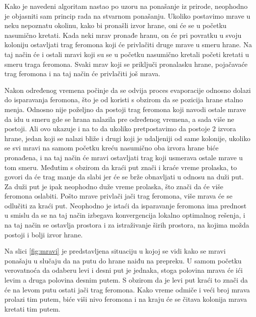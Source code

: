 \documentclass[a4paper]{article}
\begin{document}
{Kako je navedeni algoritam nastao po uzoru na ponašanje iz prirode, neophodno je objasniti sam princip rada na stvarnom ponašanju. Ukoliko postavimo mrave u neku nepoznatu okolinu, kako bi pronašli izvor hrane, oni će se u početku nasumično kretati. Kada neki mrav pronađe hranu, on će pri povratku u svoju koloniju ostavljati trag feromona koji će privlačiti druge mrave u smeru hrane. Na taj način će i ostali mravi koji su se u početku nasumično kretali početi kretati u smeru traga feromona. Svaki mrav koji se priključi pronalasku hrane, pojačavaće trag feromona i na taj način će privlačiti još mrava. 

\vspace{3mm}

Nakon određenog vremena počinje da se odvija proces evaporacije odnosno dolazi do isparavanja feromona, što je od koristi s obzirom da se pozicija hrane stalno menja. Odnosno nije poželjno da postoji trag feromona koji navodi ostale mrave da idu u smeru gde se hrana nalazila pre određenog vremena, a sada više ne postoji. Ali ovo ukazuje i na to da ukoliko pretpostavimo da postoje 2 izvora hrane, jedan koji se nalazi bliže i drugi koji je udaljeniji od same kolonije, ukoliko se svi mravi na samom početku kreću nasumično oba izvora hrane biće pronađena, i na taj način će mravi ostavljati trag koji usmerava ostale mrave u tom smeru. Međutim s obzirom da kraći put znači i kraće vreme prolaska, to govori da će trag manje da slabi jer će se brže obnavljati u odnosu na duži put. Za duži put je ipak neophodno duže vreme prolaska, što znači da će više feromona oslabiti. Pošto mrave privlači jači trag feromona, više mrava će se odlučiti za kraći put. Neophodno je istaći da isparavanje feromona ima prednost u smislu da se na taj način izbegava konvergencija lokalno optimalnog rešenja, i na taj način se ostavlja prostora i za istraživanje širih prostora, na kojima možda postoji i bolji izvor hrane.

\vspace{3mm}

Na slici \ref{fig:mravi} je predstavljena situaciju u kojoj se vidi kako se mravi ponašaju u slučaju da na putu do hrane naiđu na prepreku. U samom početku verovatnoća da odaberu levi i desni put je jednaka, stoga polovina mrava će ići levim a druga polovina desnim putem. S obzirom da je levi put kraći to znači da će na levom putu ostati jači trag feromona. Kako vreme odmiče i veći broj mrava prolazi tim putem, biće viši nivo feromona i na kraju će se čitava kolonija mrava kretati tim putem.


}
\end{document}
